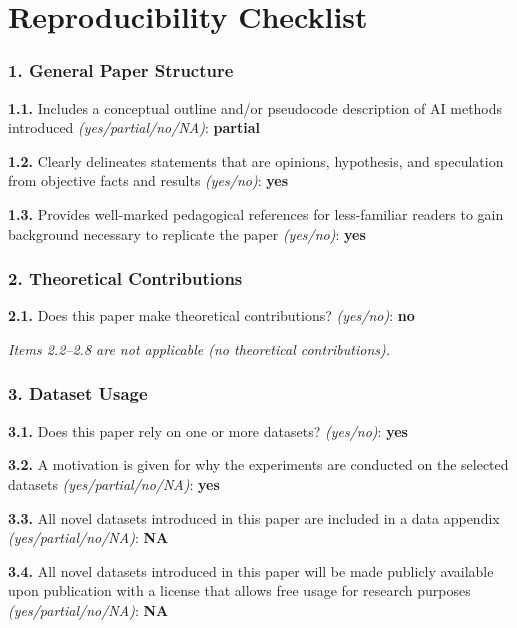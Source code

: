 
\newpage
\section*{Reproducibility Checklist}

\subsubsection*{1. General Paper Structure}

\noindent\textbf{1.1.} Includes a conceptual outline and/or pseudocode description of AI
methods introduced \textit{(yes/partial/no/NA)}: \textbf{partial}

\smallskip
\noindent\textbf{1.2.} Clearly delineates statements that are opinions, hypothesis, and
speculation from objective facts and results \textit{(yes/no)}: \textbf{yes}

\smallskip
\noindent\textbf{1.3.} Provides well-marked pedagogical references for less-familiar readers
to gain background necessary to replicate the paper \textit{(yes/no)}: \textbf{yes}

\subsubsection*{2. Theoretical Contributions}

\noindent\textbf{2.1.} Does this paper make theoretical contributions? \textit{(yes/no)}:
\textbf{no}

\smallskip
\noindent\textit{Items 2.2--2.8 are not applicable (no theoretical contributions).}

\subsubsection*{3. Dataset Usage}

\noindent\textbf{3.1.} Does this paper rely on one or more datasets? \textit{(yes/no)}: \textbf{yes}

\smallskip
\noindent\textbf{3.2.} A motivation is given for why the experiments are conducted on the
selected datasets \textit{(yes/partial/no/NA)}: \textbf{yes}

\smallskip
\noindent\textbf{3.3.} All novel datasets introduced in this paper are included in a data
appendix \textit{(yes/partial/no/NA)}: \textbf{NA}

\smallskip
\noindent\textbf{3.4.} All novel datasets introduced in this paper will be made publicly
available upon publication with a license that allows free usage for research purposes
\textit{(yes/partial/no/NA)}: \textbf{NA}

